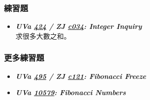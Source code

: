 \subsubsection*{練習題}
\begin{itemize}[label={\Checkmark}]
\item \textbf{\textit{UVa \href{http://uva.onlinejudge.org/external/4/424.html}{424} / ZJ \href{http://zerojudge.tw/ShowProblem?problemid=c034}{c034}: Integer Inquiry}}\\
求很多大數之和。
\end{itemize}
\subsubsection*{更多練習題}
\begin{itemize}[label={\PencilLeftDown}]
\item \textbf{\textit{UVa \href{http://uva.onlinejudge.org/external/4/495.html}{495} / ZJ \href{http://zerojudge.tw/ShowProblem?problemid=c121}{c121}: Fibonacci Freeze}}
\item \textbf{\textit{UVa \href{http://uva.onlinejudge.org/external/105/10579.html}{10579}: Fibonacci Numbers}}
\end{itemize}